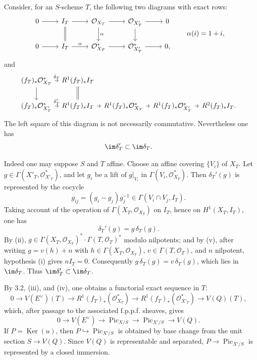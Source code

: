 \documentclass[11pt]{article}
\providecommand{\Pic}{\operatorname{Pic}}
\providecommand{\Ker}{\operatorname{Ker}}
\begin{document}
Consider, for an \(S\)-scheme \(T\), the following two diagrams with exact rows:
\[
\begin{tikzcd}
0 \arrow[r] & I_T \arrow[r] \arrow[d,equal] & \mathcal O_{X_T} \arrow[r] \arrow[d,"\alpha"] & \mathcal O_{X'_T} \arrow[r] \arrow[d] & 0\\
0 \arrow[r] & I_T \arrow[r,"\alpha"] & \mathcal O_{X_T}^{*} \arrow[r] & \mathcal O_{X'_T}^{*} \arrow[r] & 0 ,
\end{tikzcd}
\qquad \alpha(i)=1+i,
\]
and
\[
\begin{tikzcd}[column sep=tiny]
(f_T)_*\mathcal O_{X_T}^{*} \arrow[r,"\delta_T"] \arrow[d] &
R^1(f_T)_* I_T \arrow[d,equal]\\
(f_T)_*\mathcal O_{X'_T}^{*} \arrow[r,"\delta_T'"] &
R^1(f_T)_* I_T \arrow[r] &
R^1(f_T)_*\mathcal O_{X_T}^{*} \arrow[r] &
R^1(f_T)_*\mathcal O_{X'_T}^{*} \arrow[r] &
R^2(f_T)_* I_T .
\end{tikzcd}
\]
The left square of this diagram is not necessarily commutative. Nevertheless one has
\[
  \im\delta_T' \subset \im\delta_T .
\]

Indeed one may suppose \(S\) and \(T\) affine. Choose an affine covering \(\{V_i\}\) of \(X_T\). Let \(g\in\Gamma(X'_T,\mathcal O_{X'_T}^{*})\), and let \(g_i\) be a lift of \(g|_{V_i}\) in \(\Gamma(V_i,\mathcal O_{X_T}^{*})\). Then \(\delta_T'(g)\) is represented by the cocycle
\[
  g_{ij}=(g_i-g_j)g_j^{-1}\in\Gamma(V_i\cap V_j,I_T).
\]
Taking account of the operation of \(\Gamma(X_T,\mathcal O_{X_T})\) on \(I_T\), hence on \(H^1(X_T,I_T)\), one has
\[
  \delta_T'(g)=g\,\delta_T(g).
\]
By (ii), \(g\in\Gamma(X_T,\mathcal O_{X_T})^{*}\cdot\Gamma(T,\mathcal O_T)^{*}\) modulo nilpotents; and by (v), after writing \(g=v(h)+n\) with \(h\in\Gamma(X_T,\mathcal O_{X_T})\), \(v\in\Gamma(T,\mathcal O_T)\), and \(n\) nilpotent, hypothesis (i) gives \(nI_T=0\). Consequently \(g\,\delta_T(g)=v\,\delta_T(g)\), which lies in \(\im\delta_T\). Thus \(\im\delta_T'\subset\im\delta_T\).

By 3.2, (iii), and (iv), one obtains a functorial exact sequence in \(T\):
\[
  0\longrightarrow V(E^\vee)(T)\longrightarrow
  R^1(f_T)_*(\mathcal O_{X_T}^{*})
  \longrightarrow
  R^1(f_T)_*(\mathcal O_{X'_T}^{*})
  \longrightarrow
  V(Q)(T),
\]
which, after passage to the associated f.p.p.f. sheaves, gives
\[
  0\longrightarrow V(E^\vee)\longrightarrow \Pic_{X/S}
  \longrightarrow \Pic_{X'/S}\longrightarrow V(Q).
\]
If \(P=\Ker(u)\), then \(P\hookrightarrow\Pic_{X'/S}\) is obtained by base change from the unit section \(S\to V(Q)\). Since \(V(Q)\) is representable and separated, \(P\to\Pic_{X'/S}\) is represented by a closed immersion.
\end{document}
